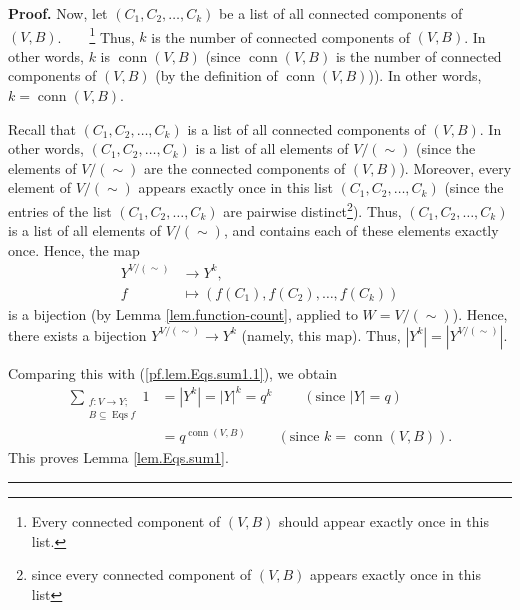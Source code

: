 \documentclass[numbers=enddot,12pt,final,onecolumn,notitlepage]{scrartcl}%
\theoremstyle{definition}
\newenvironment{proof}[1][Proof]{\noindent\textbf{#1.} }{\ \rule{0.5em}{0.5em}}
\newenvironment{verlong}{}{}
\let\sumnonlimits\sum
\renewcommand{\sum}{\sumnonlimits\limits}
\begin{document}
\begin{verlong}
\begin{proof}
Now, let $\left(  C_{1},C_{2},\ldots,C_{k}\right)  $ be a list of all
connected components of $\left(  V,B\right)  $.\ \ \ \ \footnote{Every
connected component of $\left(  V,B\right)  $ should appear exactly once in
this list.} Thus, $k$ is the number of connected components of $\left(
V,B\right)  $. In other words, $k$ is $\operatorname*{conn}\left(  V,B\right)
$ (since $\operatorname*{conn}\left(  V,B\right)  $ is the number of connected
components of $\left(  V,B\right)  $ (by the definition of
$\operatorname*{conn}\left(  V,B\right)  $)). In other words,
$k=\operatorname*{conn}\left(  V,B\right)  $.

Recall that $\left(  C_{1},C_{2},\ldots,C_{k}\right)  $ is a list of all
connected components of $\left(  V,B\right)  $. In other words, $\left(
C_{1},C_{2},\ldots,C_{k}\right)  $ is a list of all elements of $V/\left(
\sim\right)  $ (since the elements of $V/\left(  \sim\right)  $ are the
connected components of $\left(  V,B\right)  $). Moreover, every element of
$V/\left(  \sim\right)  $ appears exactly once in this list $\left(
C_{1},C_{2},\ldots,C_{k}\right)  $ (since the entries of the list $\left(
C_{1},C_{2},\ldots,C_{k}\right)  $ are pairwise distinct\footnote{since every
connected component of $\left(  V,B\right)  $ appears exactly once in this
list}). Thus, $\left(  C_{1},C_{2},\ldots,C_{k}\right)  $ is a list of all
elements of $V/\left(  \sim\right)  $, and contains each of these elements
exactly once. Hence, the map%
\begin{align*}
Y^{V/\left(  \sim\right)  }  &  \rightarrow Y^{k},\\
f  &  \mapsto\left(  f\left(  C_{1}\right)  ,f\left(  C_{2}\right)
,\ldots,f\left(  C_{k}\right)  \right)
\end{align*}
is a bijection (by Lemma \ref{lem.function-count}, applied to $W=V/\left(
\sim\right)  $). Hence, there exists a bijection $Y^{V/\left(  \sim\right)
}\rightarrow Y^{k}$ (namely, this map). Thus, $\left\vert Y^{k}\right\vert
=\left\vert Y^{V/\left(  \sim\right)  }\right\vert $.

Comparing this with (\ref{pf.lem.Eqs.sum1.1}), we obtain%
\begin{align*}
\sum_{\substack{f:V\rightarrow Y;\\B\subseteq\operatorname*{Eqs}f}}1  &
=\left\vert Y^{k}\right\vert =\left\vert Y\right\vert ^{k}=q^{k}%
\ \ \ \ \ \ \ \ \ \ \left(  \text{since }\left\vert Y\right\vert =q\right) \\
&  =q^{\operatorname*{conn}\left(  V,B\right)  }\ \ \ \ \ \ \ \ \ \ \left(
\text{since }k=\operatorname*{conn}\left(  V,B\right)  \right)  .
\end{align*}
This proves Lemma \ref{lem.Eqs.sum1}.
\end{proof}
\end{verlong}
\end{document}
